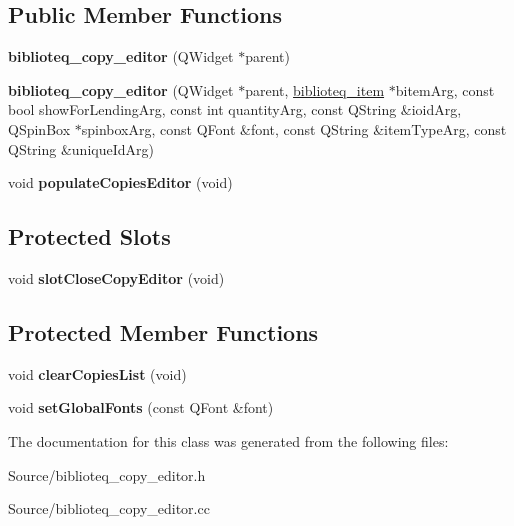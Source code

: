 \subsection*{Public Member Functions}
\begin{DoxyCompactItemize}
\item 
{\bfseries biblioteq\+\_\+copy\+\_\+editor} (Q\+Widget $\ast$parent)\hypertarget{classbiblioteq__copy__editor_a6cceb037e03461cb0d4e5a0d3d489816}{}\label{classbiblioteq__copy__editor_a6cceb037e03461cb0d4e5a0d3d489816}

\item 
{\bfseries biblioteq\+\_\+copy\+\_\+editor} (Q\+Widget $\ast$parent, \hyperlink{classbiblioteq__item}{biblioteq\+\_\+item} $\ast$bitem\+Arg, const bool show\+For\+Lending\+Arg, const int quantity\+Arg, const Q\+String \&ioid\+Arg, Q\+Spin\+Box $\ast$spinbox\+Arg, const Q\+Font \&font, const Q\+String \&item\+Type\+Arg, const Q\+String \&unique\+Id\+Arg)\hypertarget{classbiblioteq__copy__editor_ac0b0f73f588a1722dc8246bf47605f00}{}\label{classbiblioteq__copy__editor_ac0b0f73f588a1722dc8246bf47605f00}

\item 
void {\bfseries populate\+Copies\+Editor} (void)\hypertarget{classbiblioteq__copy__editor_aef96ac95e48bfed49407d25437aaf493}{}\label{classbiblioteq__copy__editor_aef96ac95e48bfed49407d25437aaf493}

\end{DoxyCompactItemize}
\subsection*{Protected Slots}
\begin{DoxyCompactItemize}
\item 
void {\bfseries slot\+Close\+Copy\+Editor} (void)\hypertarget{classbiblioteq__copy__editor_a2b8e609c6700813a918e19c0171d3e40}{}\label{classbiblioteq__copy__editor_a2b8e609c6700813a918e19c0171d3e40}

\end{DoxyCompactItemize}
\subsection*{Protected Member Functions}
\begin{DoxyCompactItemize}
\item 
void {\bfseries clear\+Copies\+List} (void)\hypertarget{classbiblioteq__copy__editor_a7ac49564b84dd0f3095c5ab4ddc4fe63}{}\label{classbiblioteq__copy__editor_a7ac49564b84dd0f3095c5ab4ddc4fe63}

\item 
void {\bfseries set\+Global\+Fonts} (const Q\+Font \&font)\hypertarget{classbiblioteq__copy__editor_aea18dad7328884d26c2e7d03770aa14b}{}\label{classbiblioteq__copy__editor_aea18dad7328884d26c2e7d03770aa14b}

\end{DoxyCompactItemize}


The documentation for this class was generated from the following files\+:\begin{DoxyCompactItemize}
\item 
Source/biblioteq\+\_\+copy\+\_\+editor.\+h\item 
Source/biblioteq\+\_\+copy\+\_\+editor.\+cc\end{DoxyCompactItemize}
